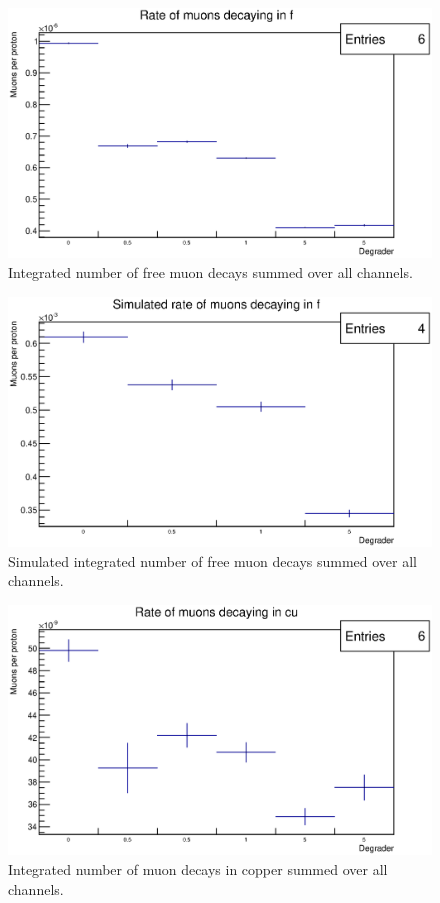 \begin{figure}[hptb]
  \centering
    \includegraphics[width=.9\textwidth]{images/momentum_spectrum/run_muon_rate_in_f.eps}
  \caption{Integrated number of free muon decays summed over all channels.}
  \label{fig:images_momentum_spectrum_run_muon_rate_in_f}
\end{figure}
\begin{figure}[hptb]
  \centering
    \includegraphics[width=.9\textwidth]{images/momentum_spectrum/sim_muon_rate_in_f.eps}
  \caption{Simulated integrated number of free muon decays summed over all channels.}
  \label{fig:images_momentum_spectrum_sim_muon_rate_in_f}
\end{figure}
\begin{figure}[hptb]
  \centering
    \includegraphics[width=.9\textwidth]{images/momentum_spectrum/run_muon_rate_in_cu.eps}
  \caption{Integrated number of muon decays in copper summed over all channels.}
  \label{fig:images_momentum_spectrum_run_muon_rate_in_cu}
\end{figure}

